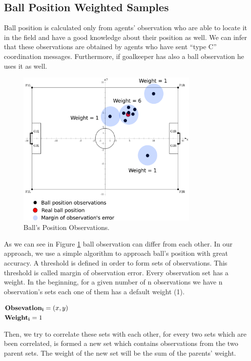 \subsection{Ball Position Weighted Samples}
Ball position is calculated only from agents' observation who are able to locate it in the field and have a good knowledge about their position as well. We can infer that these observations are obtained by agents who have sent ``type C'' coordination messages. Furthermore, if goalkeeper has also a ball observation he uses it as well.
\begin{figure}[htb!]
\centering
  \includegraphics[width=0.8\textwidth]{Chapter4/figures/Ball.pdf}
  \caption{Ball's Position Observations.} 
  \label{fig:Ball}
\end{figure}
As we can see in Figure \ref{fig:Ball} ball observation can differ from each other. In our approach, we use a simple algorithm to approach ball's position with great accuracy. A threshold is defined in order to form sets of observations. This threshold is called margin of observation error. Every observation set has a weight. In the beginning, for a given number of n observations we have n observation's sets each one of them has a default weight (1).\\
\begin{center}
${\bf Obsevation_{i} } = (x,y)$\\
${\bf Weight_{i}} = 1$\\
\end{center}
Then, we try to correlate these sets with each other, for every two sets which are been correlated, is formed a new set which contains observations from the two parent sets. The weight of the new set will be the sum of the parents' weight.\\
